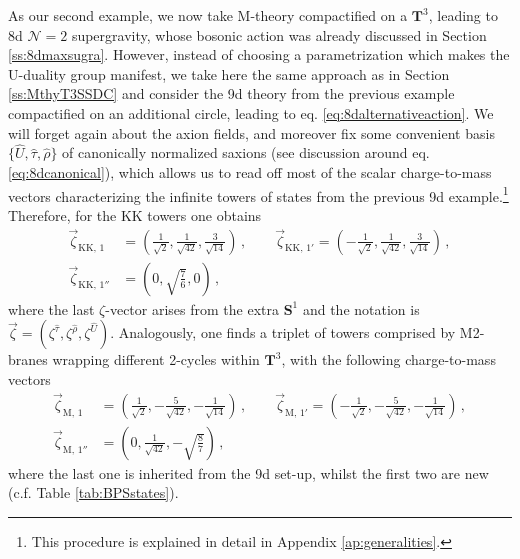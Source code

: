 As our second example, we now take M-theory compactified on a $\mathbf{T}^3$, leading to 8d $\mathcal N=2$ supergravity, whose bosonic action was already discussed in Section \ref{ss:8dmaxsugra}. However, instead of choosing a parametrization which makes the U-duality group manifest, we take here the same approach as in Section \ref{ss:MthyT3SSDC} and consider the 9d theory from the previous example compactified on an additional circle, leading to eq. \eqref{eq:8dalternativeaction}. We will forget again about the axion fields, and moreover fix some convenient basis $\{ \hat U, \hat \tau, \hat \rho\}$ of canonically normalized saxions (see discussion around eq. \eqref{eq:8dcanonical}), which allows us to read off most of the scalar charge-to-mass vectors characterizing the infinite towers of states from the previous 9d example.\footnote{This procedure is explained in detail in Appendix \ref{ap:generalities}.} Therefore, for the KK towers one obtains
%
\begin{equation}
	\begin{split} 
		\vec{\zeta}_{\text{KK},\, 1} &= \left( \frac{1}{\sqrt{2}} , \frac{1}{\sqrt{42}}, \frac{3}{\sqrt{14}} \right) \, , \qquad \vec{\zeta}_{\text{KK},\, 1'} = \left( -\frac{1}{\sqrt{2}} , \frac{1}{\sqrt{42}}, \frac{3}{\sqrt{14}} \right) \, ,\\
		\vec{\zeta}_{\text{KK},\, 1''} &= \left( 0 , \sqrt{\frac{7}{6}}, 0 \right) \, ,
	\end{split}
\end{equation}
%
where the last $\zeta$-vector arises from the extra $\mathbf{S}^1$ and the notation is $\vec{\zeta}=\left(\zeta^{\hat \tau}, \zeta^{\hat \rho}, \zeta^{\hat U}\right)$. Analogously, one finds a triplet of towers comprised by M2-branes wrapping different 2-cycles within $\mathbf{T}^3$, with the following charge-to-mass vectors
%
\begin{equation} \label{eq:M2vectorspattern}
	\begin{split} 
		\vec{\zeta}_{\text{M},\, 1} &= \left( \frac{1}{\sqrt{2}} , -\frac{5}{\sqrt{42}}, -\frac{1}{\sqrt{14}} \right) \, , \qquad \vec{\zeta}_{\text{M},\, 1'} = \left( -\frac{1}{\sqrt{2}} , -\frac{5}{\sqrt{42}}, -\frac{1}{\sqrt{14}} \right) \, ,\\
		\vec{\zeta}_{\text{M},\, 1''} &= \left( 0, \frac{1}{\sqrt{42}}, -\sqrt{\frac{8}{7}} \right)  \, ,
	\end{split}
\end{equation}
%
where the last one is inherited from the 9d set-up, whilst the first two are new (c.f. Table \ref{tab:BPSstates}). %
